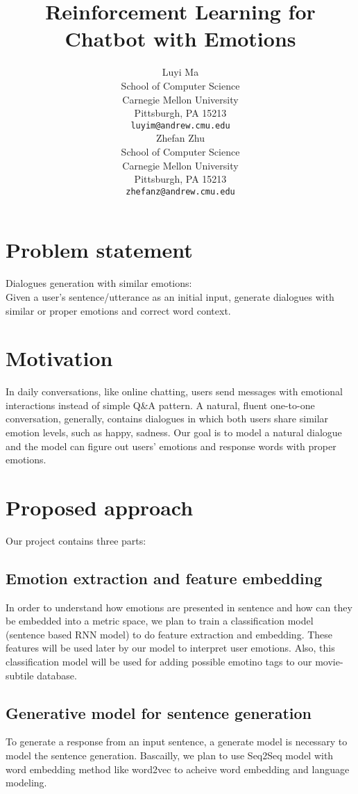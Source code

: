 \documentclass{article}
\title{Reinforcement Learning for Chatbot with Emotions}
\author{
  Luyi Ma \\
  School of Computer Science\\
  Carnegie Mellon University\\
  Pittsburgh, PA 15213 \\
  \texttt{luyim@andrew.cmu.edu} \\
  \And
  Zhefan Zhu \\
  School of Computer Science \\
  Carnegie Mellon University\\
  Pittsburgh, PA 15213 \\
  \texttt{zhefanz@andrew.cmu.edu} \\  
}
\begin{document}

\maketitle



\section{Problem statement}
Dialogues generation with similar emotions: \\
Given a user's sentence/utterance as an initial input, generate dialogues with similar or proper emotions and correct word context.



\section{Motivation}
In daily conversations, like online chatting, users send messages with emotional interactions instead of simple Q\&A pattern. A natural, fluent one-to-one conversation, generally, contains dialogues in which both users share similar emotion levels, such as happy, sadness. Our goal is to model a natural dialogue and the model can figure out users' emotions and response words with proper emotions.




\section{Proposed approach}
Our project contains three parts:


\subsection{Emotion extraction and feature embedding}
In order to understand how emotions are presented in sentence and how can they be embedded into a metric space, we plan to train a classification model (sentence based RNN model) to do feature extraction and embedding. These features will be used later by our model to interpret user emotions. Also, this classification model will be used for adding possible emotino tags to our movie-subtile database. \par



\subsection{Generative model for sentence generation}
To generate a response from an input sentence, a generate model is necessary to model the sentence generation. Bascailly, we plan to use Seq2Seq model with word embedding method like word2vec to acheive word embedding and language modeling.
\end{document}
